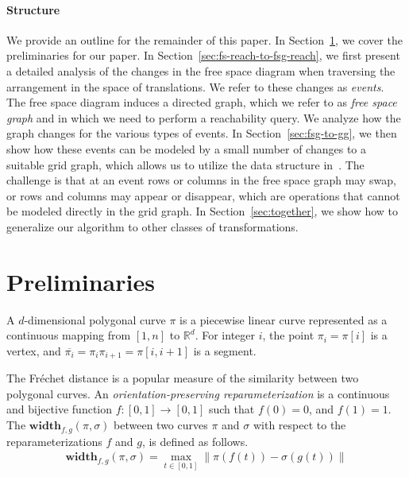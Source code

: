 \documentclass[thm-restate]{lipics-v2021}
\theoremstyle{remark}
\newcommand{\abse}[1]{\lVert #1 \rVert}
\newcommand{\reals}[0]{\mathbb{R}}
\newcommand{\cseg}[1]{\overline{#1}}
\begin{document}
\paragraph*{Structure}
We provide an outline for the remainder of this paper. In Section~\ref{sec:prelim}, we cover the preliminaries for our paper. In Section~\ref{sec:fs-reach-to-fsg-reach}, we first present a detailed analysis of the changes in the free space diagram when traversing the arrangement in the space of translations. We refer to these changes as \emph{events}.
The free space diagram induces a directed graph, 
which we refer to as \emph{free space graph} and 
in which we need to perform a reachability query. We analyze how the graph changes for the various types of events. In Section~\ref{sec:fsg-to-gg}, 
we then show how these events can be modeled by a small number of changes to a suitable grid graph, which allows us to utilize the data structure in~\cite{bringmannFrechetDistanceTranslation2021}. The challenge is that at an event rows or columns in the free space graph may swap, or rows and columns may appear or disappear, which are operations that cannot be modeled directly in the grid graph.
In Section~\ref{sec:together}, we show how to generalize our algorithm to other classes of transformations.


\section{Preliminaries}\label{sec:prelim}

\newcommand{\width}[0]{\textbf{width}}
A $d$-dimensional polygonal curve $\pi$ is a piecewise linear curve represented as a continuous mapping from $[1, n]$ to $\reals^d$. For integer $i$, the point $\pi_i = \pi[i]$ is a vertex, and $\cseg{\pi_i} = \pi_i \pi_{i + 1} = \pi[i, i + 1]$ is a segment.

The Fréchet distance is a popular measure of the similarity between two polygonal curves. 
An \emph{orientation-preserving reparameterization} is a continuous and bijective function $f: [0, 1] \rightarrow [0, 1]$ such that $f(0) = 0$, and $f(1) = 1$. The $\width_{f, g}(\pi, \sigma)$ between two curves $\pi$ and $\sigma$ with respect to the reparameterizations $f$ and $g$, is defined as follows. 
\begin{align*}
    \width_{f, g}(\pi, \sigma) = \max_{t \in [0, 1]} \abse{\pi(f(t)) - \sigma(g(t))}
\end{align*}

\newcommand{\fredist}[1]{\delta_F(#1)}
\end{document}
